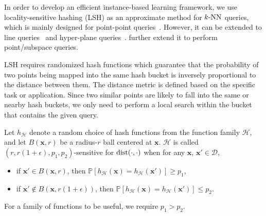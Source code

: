 In order to develop an efficient instance-based learning framework, we use locality-sensitive hashing (LSH) as an approximate method for $k\text{-NN}$ queries, which is mainly designed for point-point queries~\cite{Andoni:2008:NHA}. However, it can be extended to line queries~\cite{Andoni:2009:ALN} and hyper-plane queries~\cite{Jain:nips:2010}. \cite{Basri:2011} further extend it to perform point/subspace queries.

LSH requires randomized hash functions which guarantee that the probability of two points being mapped into the same hash bucket is inversely proportional to the distance between them. The distance metric is defined based on the specific task or application. Since two similar points are likely to fall into the same or nearby hash buckets, we only need to perform a local search within the bucket that contains the given query.


\begin{definition}
\label{def:3:lsh}
  \cite{Andoni:2008:NHA} Let $h_{\mathcal H}$ denote a random choice of hash functions from the function family $\mathcal H$, and let $B(\mathbf x, r)$ be a radius-$r$ ball centered at $\mathbf x$.  $\mathcal H$ is called $(r, r(1+\epsilon), p_1, p_2)$-sensitive for $\operatorname{dist}(\cdot, \cdot)$ when for any $\mathbf x$, $\mathbf x' \in \mathcal D$,
  \begin{itemize}
  \item if $\mathbf x' \in B(\mathbf x, r)$, then $\mathbb P[h_{\mathcal H}(\mathbf x) = h_{\mathcal H}(\mathbf x')] \geq p_1$,
  \item if $\mathbf x' \notin B(\mathbf x, r(1+\epsilon))$, then $\mathbb P[h_{\mathcal H}(\mathbf x) = h_{\mathcal H}(\mathbf x')] \leq p_2$.
  \end{itemize}
\end{definition}
For a family of functions to be useful, we require $p_1 > p_2$.

